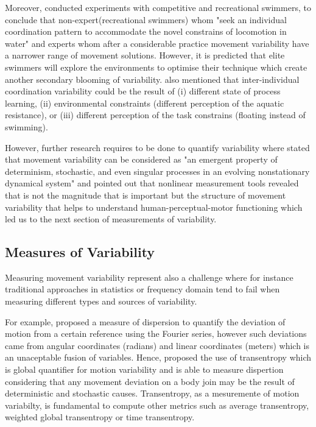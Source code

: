 Moreover, \cite{seifert2011} conducted experiments with competitive and recreational swimmers, 
to conclude that non-expert(recreational swimmers) whom "seek an individual 
coordination pattern to accommodate the novel constrains of locomotion in water"
and experts whom after a considerable practice movement variability 
have a narrower range of movement solutions. However, it is predicted 
that elite swimmers will explore the environments to optimise 
their technique which create another  secondary blooming of variability.
\cite{seifert2011} also mentioned that inter-individual coordination variability 
could be the result of (i) different state of process learning,
(ii) environmental constraints (different perception of the aquatic resistance), or
(iii) different perception of the task constrains (floating instead of swimming).


However, further research requires to be done to quantify variability 
where \cite{newell1998} stated that movement variability can be considered as 
"an emergent property of determinism, stochastic, and even singular processes
in an evolving nonstationary dynamical system" and \cite{stergiou2011} 
pointed out that nonlinear measurement tools revealed that is not the magnitude 
that is important but the structure of movement variability that helps 
to understand human-perceptual-motor functioning which led us to 
the next section of measurements of variability.


\subsection{Measures of Variability}
Measuring movement variability represent also a challenge where for instance 
traditional approaches in statistics or frequency domain tend to fail when 
measuring different types and sources of variability.

For example, \cite{hatze1986} proposed a measure of dispersion to quantify the 
deviation of motion from a certain reference using the Fourier series, however such 
deviations came from angular coordinates (radians) and linear coordinates (meters) 
which is an unaceptable fusion of variables.
Hence, \cite{hatze1986} proposed the use of transentropy which is global quantifier 
for motion variability and is able to measure dispertion considering that any 
movement deviation on a body join may be the result of deterministic and stochastic causes.
Transentropy, as a mesuremente of motion variabilty, is fundamental to compute other 
metrics such as average transentropy, weighted global transentropy or time transentropy.

